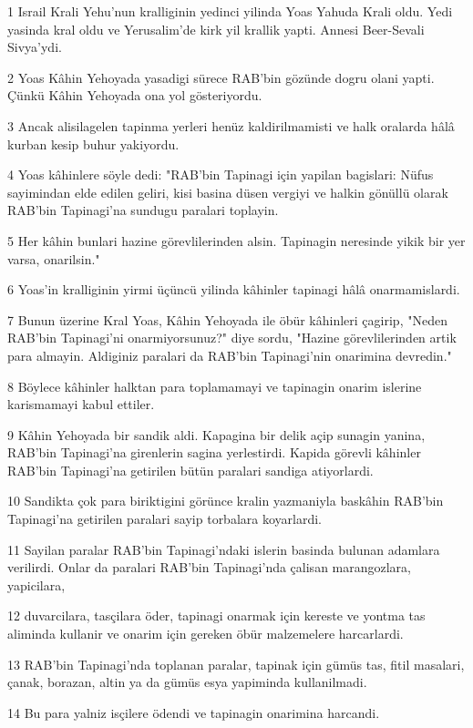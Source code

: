 \par 1 Israil Krali Yehu'nun kralliginin yedinci yilinda Yoas Yahuda Krali oldu. Yedi yasinda kral oldu ve Yerusalim'de kirk yil krallik yapti. Annesi Beer-Sevali Sivya'ydi.
\par 2 Yoas Kâhin Yehoyada yasadigi sürece RAB'bin gözünde dogru olani yapti. Çünkü Kâhin Yehoyada ona yol gösteriyordu.
\par 3 Ancak alisilagelen tapinma yerleri henüz kaldirilmamisti ve halk oralarda hâlâ kurban kesip buhur yakiyordu.
\par 4 Yoas kâhinlere söyle dedi: "RAB'bin Tapinagi için yapilan bagislari: Nüfus sayimindan elde edilen geliri, kisi basina düsen vergiyi ve halkin gönüllü olarak RAB'bin Tapinagi'na sundugu paralari toplayin.
\par 5 Her kâhin bunlari hazine görevlilerinden alsin. Tapinagin neresinde yikik bir yer varsa, onarilsin."
\par 6 Yoas'in kralliginin yirmi üçüncü yilinda kâhinler tapinagi hâlâ onarmamislardi.
\par 7 Bunun üzerine Kral Yoas, Kâhin Yehoyada ile öbür kâhinleri çagirip, "Neden RAB'bin Tapinagi'ni onarmiyorsunuz?" diye sordu, "Hazine görevlilerinden artik para almayin. Aldiginiz paralari da RAB'bin Tapinagi'nin onarimina devredin."
\par 8 Böylece kâhinler halktan para toplamamayi ve tapinagin onarim islerine karismamayi kabul ettiler.
\par 9 Kâhin Yehoyada bir sandik aldi. Kapagina bir delik açip sunagin yanina, RAB'bin Tapinagi'na girenlerin sagina yerlestirdi. Kapida görevli kâhinler RAB'bin Tapinagi'na getirilen bütün paralari sandiga atiyorlardi.
\par 10 Sandikta çok para biriktigini görünce kralin yazmaniyla baskâhin RAB'bin Tapinagi'na getirilen paralari sayip torbalara koyarlardi.
\par 11 Sayilan paralar RAB'bin Tapinagi'ndaki islerin basinda bulunan adamlara verilirdi. Onlar da paralari RAB'bin Tapinagi'nda çalisan marangozlara, yapicilara,
\par 12 duvarcilara, tasçilara öder, tapinagi onarmak için kereste ve yontma tas aliminda kullanir ve onarim için gereken öbür malzemelere harcarlardi.
\par 13 RAB'bin Tapinagi'nda toplanan paralar, tapinak için gümüs tas, fitil masalari, çanak, borazan, altin ya da gümüs esya yapiminda kullanilmadi.
\par 14 Bu para yalniz isçilere ödendi ve tapinagin onarimina harcandi.
